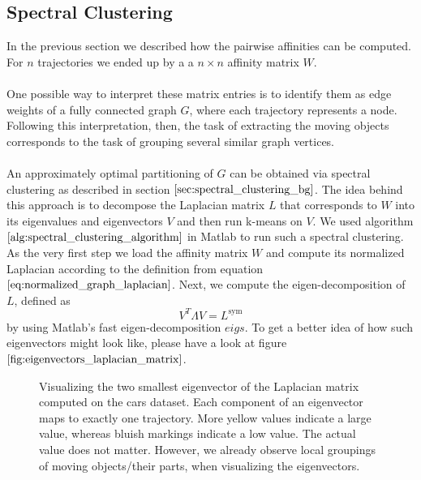 \subsection{Spectral Clustering}
In the previous section we described how the pairwise affinities can be computed. For $n$ trajectories we ended up by a a $n \times n$ affinity matrix $W$. \\ \\ 
One possible way to interpret these matrix entries is to identify them as edge weights of a fully connected graph $G$, where each trajectory represents a node. Following this interpretation, then, the task of extracting the moving objects  corresponds to the task of grouping several similar graph vertices. \\ \\
An approximately optimal partitioning of $G$ can be obtained via spectral clustering as described in section $\ref{sec:spectral_clustering_bg}$. The idea behind this approach is to decompose the Laplacian matrix $L$ that corresponds to $W$ into its eigenvalues and eigenvectors $V$ and then run k-means on $V$. We used algorithm $\ref{alg:spectral_clustering_algorithm}$ in Matlab to run such a spectral clustering. As the very first step we load the affinity matrix $W$ and compute its normalized Laplacian according to the definition from equation $\ref{eq:normalized_graph_laplacian}$. Next, we compute the eigen-decomposition of $L$, defined as
\begin{equation}
	V^{T} \Lambda V = L^{\text{sym}}
\end{equation}
by using Matlab's fast eigen-decomposition $\textit{eigs}$. To get a better idea of how such eigenvectors might look like, please have a look at figure $\ref{fig:eigenvectors_laplacian_matrix}$.
\begin{figure}[H]
\begin{center}
\end{center}
\caption[Eigenvectors of Laplacian Matrix]{Visualizing the two smallest eigenvector of the Laplacian matrix computed on the cars dataset. Each component of an eigenvector maps to exactly one trajectory. More yellow values indicate a large value, whereas bluish markings indicate a low value. The actual value does not matter. However, we already observe local groupings of moving objects/their parts, when visualizing the eigenvectors.}
\label{fig:eigenvectors_laplacian_matrix}
\end{figure}

